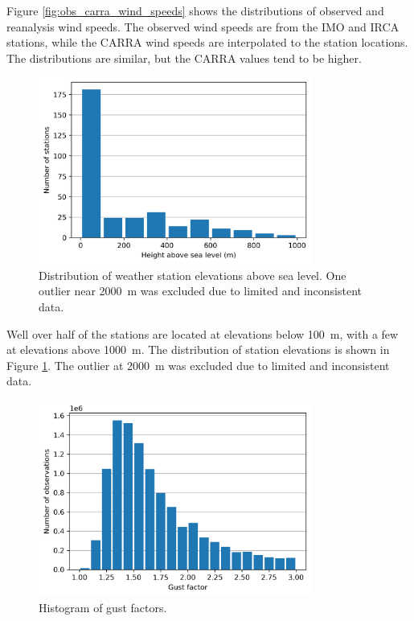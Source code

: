 Figure \ref{fig:obs_carra_wind_speeds} shows the distributions of observed and reanalysis wind speeds. The observed wind speeds are from the IMO and IRCA stations, while the CARRA wind speeds are interpolated to the station locations. The distributions are similar, but the CARRA values tend to be higher.

\begin{figure}[ht]
  \centering
  \includegraphics[width=0.8\textwidth]{Figures/station_heights.png}
  \caption[Distribution of weather station elevations above sea level.]{Distribution of weather station elevations above sea level. One outlier near 2000~m was excluded due to limited and inconsistent data.}
  \label{fig:station_heights}
\end{figure}

Well over half of the stations are located at elevations below 100~m, with a few at elevations above 1000~m. The distribution of station elevations is shown in Figure \ref{fig:station_heights}. The outlier at 2000~m was excluded due to limited and inconsistent data.

\begin{figure}[ht]
  \centering
  \includegraphics[width=0.8\textwidth]{Figures/gust_factor_2025.png}
  \caption[Histogram of gust factors.]{Histogram of gust factors.}
  \label{fig:gust_factors}
\end{figure}

